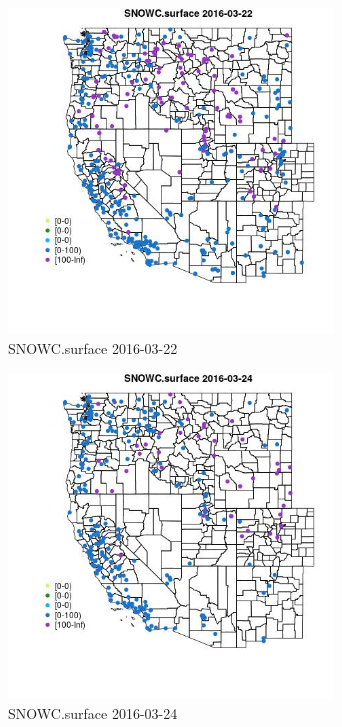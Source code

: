 \begin{figure} 
\centering  
\includegraphics[width=0.77\textwidth]{Code_Outputs/Report_ML_input_PM25_Step4_part_e_de_duplicated_aveswNAs_MapObsSNOWCsurface2016-03-22.jpg} 
\caption{\label{fig:Report_ML_input_PM25_Step4_part_e_de_duplicated_aveswNAsMapObsSNOWCsurface2016-03-22}SNOWC.surface 2016-03-22} 
\end{figure} 
 

\begin{figure} 
\centering  
\includegraphics[width=0.77\textwidth]{Code_Outputs/Report_ML_input_PM25_Step4_part_e_de_duplicated_aveswNAs_MapObsSNOWCsurface2016-03-24.jpg} 
\caption{\label{fig:Report_ML_input_PM25_Step4_part_e_de_duplicated_aveswNAsMapObsSNOWCsurface2016-03-24}SNOWC.surface 2016-03-24} 
\end{figure} 
 

